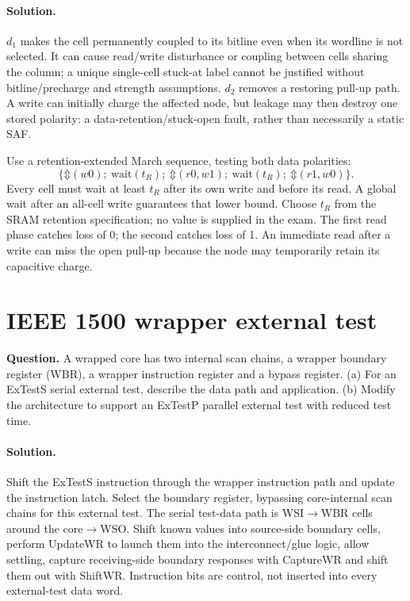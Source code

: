 \documentclass[11pt]{article}
\newcommand{\sol}{\paragraph{Solution.}}
\newcommand{\any}{\mathord{\Updownarrow}}
\begin{document}
\sol $d_1$ makes the cell permanently coupled to its bitline even when its
wordline is not selected. It can cause read/write disturbance or coupling
between cells sharing the column; a unique single-cell stuck-at label cannot
be justified without bitline/precharge and strength assumptions.
$d_2$ removes a restoring pull-up path. A write can initially charge the
affected node, but leakage may then destroy one stored polarity: a
data-retention/stuck-open fault, rather than necessarily a static SAF.

Use a retention-extended March sequence, testing both data polarities:
\[
\{\any(w0);\ \mathrm{wait}(t_R);\ \any(r0,w1);\
  \mathrm{wait}(t_R);\ \any(r1,w0)\}.
\]
Every cell must wait at least $t_R$ after its own write and before its read.
A global wait after an all-cell write guarantees that lower bound.
Choose $t_R$ from the SRAM retention specification; no value is supplied in
the exam. The first read phase catches loss of 0; the second catches loss of 1.
An immediate read after a write can miss the open pull-up because the
node may temporarily retain its capacitive charge.

\section{IEEE 1500 wrapper external test}
\textbf{Question.} A wrapped core has two internal scan chains, a wrapper
boundary register (WBR), a wrapper instruction register and a bypass register.
(a) For an ExTestS serial external test, describe the data path and application.
(b) Modify the architecture to support an ExTestP parallel external test with
reduced test time.
\begin{center}\end{center}

\sol Shift the ExTestS instruction through the wrapper instruction path and update
the instruction latch. Select the boundary register, bypassing core-internal
scan chains for this external test. The serial test-data path is
WSI$\to$WBR cells around the core$\to$WSO.
Shift known values into source-side boundary cells, perform UpdateWR to launch
them into the interconnect/glue logic, allow settling, capture receiving-side
boundary responses with CaptureWR and shift them out with ShiftWR.
Instruction bits are control, not inserted into every external-test data word.
\end{document}
